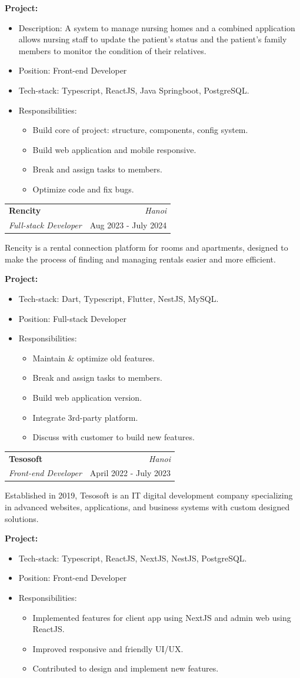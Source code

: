 \documentclass[a4paper, 11pt]{article}
\makeatletter
\newcommand{\resumeSubheading}[4]{
\vspace{0.5mm}
\item
\begin{tabular*}{0.98\textwidth}[t]{l@{\extracolsep{\fill}}r}
	\textbf{#1}                & \textit{\footnotesize{#4}} \\
	\textit{\footnotesize{#3}} & \footnotesize{#2}          \\
\end{tabular*}
\vspace{-2.4mm}
}
\newcommand{\projectHeading}[1]{%
\textbf{Project:} \text{#1}%
\vspace{-3.0mm}%
}
\newcommand{\responsibilities}{%
\item{Responsibilities:}%
\begin{itemize}[leftmargin=6ex,noitemsep,labelsep=1mm,itemsep=0mm,label={·}]\small%
}
\newcommand{\responsibilitiesEnd}{\end{itemize}}
\newcommand{\companyDesc}[1]{%
\vspace{4.0mm}%
#1%
\vspace{2.0mm}%
}
\newcommand{\resumeItemListStart}{\begin{justify}\begin{itemize}[leftmargin=3ex,
rightmargin=2ex, noitemsep,labelsep=1.2mm,itemsep=0mm]\small}
\newcommand{\resumeItemListEnd}{\end{itemize}\end{justify}
\vspace{-2mm}}
\makeatother
\begin{document}
\projectHeading{Nursingcare}
\resumeItemListStart
\item {Description: A system to manage nursing homes and a combined application
            allows nursing staff to update the patient's status and the patient's family
            members to monitor the condition of their relatives.}
\item {Position: Front-end Developer}
\item {Tech-stack: Typescript, ReactJS, Java Springboot, PostgreSQL.}
\responsibilities
\item {Build core of project: structure, components, config system.}
\item {Build web application and mobile responsive.}
\item {Break and assign tasks to members.}
\item {Optimize code and fix bugs.}
\responsibilitiesEnd
\resumeItemListEnd

\resumeSubheading{Rencity}{Aug 2023 - July 2024}{Full-stack Developer}{Hanoi}
\companyDesc{
	Rencity is a rental connection
	platform for rooms and apartments, designed to make the process of finding and managing rentals easier
	and more efficient.
}

\projectHeading{Rencity}
\resumeItemListStart
\item {Tech-stack: Dart, Typescript, Flutter, NestJS, MySQL.}
\item {Position: Full-stack Developer}
\responsibilities
\item {Maintain \& optimize old features.}
\item {Break and assign tasks to members.}
\item {Build web application version.}
\item {Integrate 3rd-party platform.}
\item {Discuss with customer to build new features.}
\responsibilitiesEnd
\resumeItemListEnd

\resumeSubheading{Tesosoft}{April 2022 - July 2023}{Front-end Developer}{Hanoi}
\companyDesc{
	Established in 2019, Tesosoft is an IT digital development company specializing in
	advanced websites, applications, and business systems with custom designed solutions.
}

\projectHeading{AMK}
\resumeItemListStart
\item {Tech-stack: Typescript, ReactJS, NextJS, NestJS, PostgreSQL.}
\item {Position: Front-end Developer}
\responsibilities
\item {Implemented features for client app using NextJS and admin web using ReactJS.}
\item {Improved responsive and friendly UI/UX.}
\item {Contributed to design and implement new features.}
\responsibilitiesEnd
\resumeItemListEnd
\vspace{2.0mm}
\end{document}
